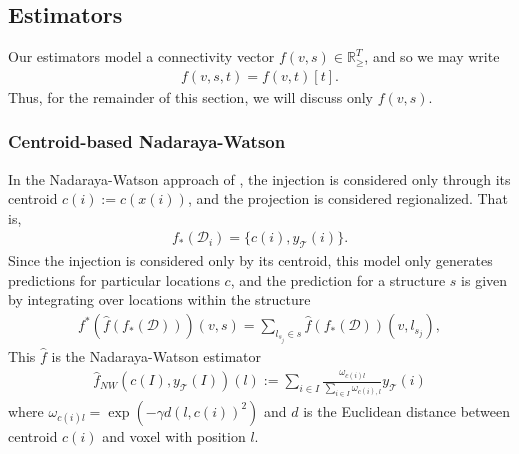 
\newpage
\subsection{Estimators}
\label{supp_sec:estimators}
Our estimators model a connectivity vector $f (v,s)  \in \mathbb R_{\geq}^T$, and so we may write
\begin{eqnarray*}
f (v,s,t) = f (v,t)[t].
\end{eqnarray*}
Thus, for the remainder of this section, we will discuss only $f (v,s)$.

\subsubsection{Centroid-based Nadaraya-Watson}

In the Nadaraya-Watson approach of \citet{Knox2019-ot}, the injection is considered only through its centroid $c(i) := c(x(i))$, and the projection is considered regionalized.
That is,
\begin{eqnarray*}
f_*({\mathcal D}_i) = \{c(i), y_{\mathcal T}(i)\}.
\end{eqnarray*}
Since the injection is considered only by its centroid, this model only generates predictions for particular locations $c$, and the prediction for a structure $s$ is given by integrating over locations within the structure
\begin{eqnarray*}
\label{eq:regionalize}
f^* (\hat f (f_*(\mathcal D))) (v,s) = \sum_{l_{s_j} \in s} \hat f (f_*(\mathcal D)) (v,l_{s_j}),
\end{eqnarray*}
This $\hat f$ is the Nadaraya-Watson estimator
\begin{eqnarray*}
\hat f_{NW}( c(I) , y_{\mathcal T}(I) ) (l) :=  \sum_{i \in I} \frac{ \omega_{c(i) l}}{\sum_{i \in I} \omega_{c(i), l}} y_{\mathcal T}(i)
\end{eqnarray*}
where $\omega_{c(i) l } = \exp( - \gamma d( l , c(i))^2 )$ and $d$ is the Euclidean distance between centroid $c(i)$ and voxel with position $l$.

